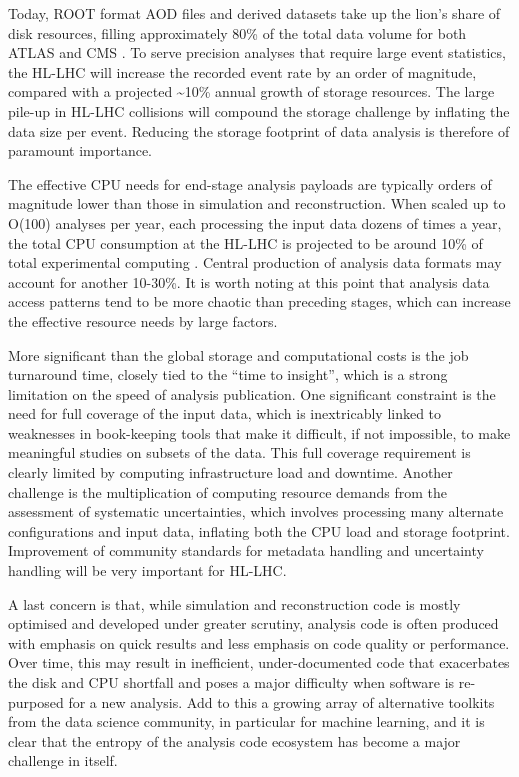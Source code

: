 \documentclass[11pt,a4paper]{article}
\begin{document}
Today, ROOT format AOD files and derived datasets take up the lion's
share of disk resources, filling approximately 80\% of the total data
volume for both ATLAS and CMS \cite{Ref1,Ref2}. To serve precision analyses
that require large event statistics, the HL-LHC will increase the
recorded event rate by an order of magnitude, compared with a projected
\textasciitilde 10\% annual growth of storage resources. The large pile-up in HL-LHC
collisions will compound the storage challenge by inflating the data
size per event. Reducing the storage footprint of data analysis is
therefore of paramount importance.

The effective CPU needs for end-stage analysis payloads are typically
orders of magnitude lower than those in simulation and reconstruction.
When scaled up to O(100) analyses per year, each processing the input
data dozens of times a year, the total CPU consumption at the HL-LHC is
projected to be around 10\% of total experimental computing \cite{Ref1,Ref2}.
Central production of analysis data formats may account for another
10-30\%. It is worth noting at this point that analysis data access
patterns tend to be more chaotic than preceding stages, which can
increase the effective resource needs by large factors.

More significant than the global storage and computational costs is the
job turnaround time, closely tied to the ``time to insight'', which is a
strong limitation on the speed of analysis publication. One significant
constraint is the need for full coverage of the input data, which is
inextricably linked to weaknesses in book-keeping tools that make it
difficult, if not impossible, to make meaningful studies on subsets of
the data. This full coverage requirement is clearly limited by computing
infrastructure load and downtime. Another challenge is the
multiplication of computing resource demands from the assessment of
systematic uncertainties, which involves processing many alternate
configurations and input data, inflating both the CPU load and storage
footprint. Improvement of community standards for metadata handling and
uncertainty handling will be very important for HL-LHC.

A last concern is that, while simulation and reconstruction code is
mostly optimised and developed under greater scrutiny, analysis code is
often produced with emphasis on quick results and less emphasis on code
quality or performance. Over time, this may result in inefficient,
under-documented code that exacerbates the disk and CPU shortfall and
poses a major difficulty when software is re-purposed for a new analysis.
Add to this a growing array of alternative toolkits from the data
science community, in particular for machine learning, and it is clear
that the entropy of the analysis code ecosystem has become a major
challenge in itself.
\end{document}
